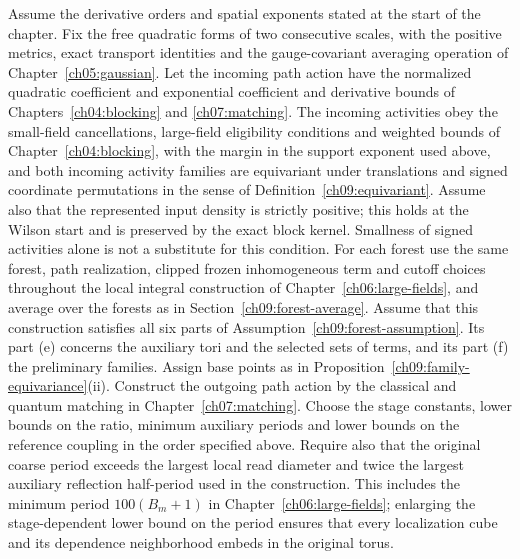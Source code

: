 \begin{theorem}
\label{ch09:step-theorem}
Assume the derivative orders and spatial exponents stated at
the start of the chapter. Fix the free quadratic forms of two consecutive scales, with the
positive metrics, exact transport identities and the gauge-covariant averaging operation
of Chapter~\ref{ch05:gaussian}. Let the incoming path action have the
normalized quadratic coefficient and exponential coefficient and
derivative bounds of Chapters~\ref{ch04:blocking} and
\ref{ch07:matching}. The incoming activities obey the small-field
cancellations, large-field eligibility conditions and weighted bounds of
Chapter~\ref{ch04:blocking}, with the margin in the support exponent used above, and both incoming activity families are equivariant under translations and signed coordinate permutations in the sense of Definition~\ref{ch09:equivariant}.
Assume also that the represented input density is strictly positive;
this holds at the Wilson start and is preserved by the exact block
kernel. Smallness of signed activities alone is not a substitute
for this condition.
For each forest use the same forest, path realization, clipped frozen inhomogeneous term and
cutoff choices throughout the local integral construction of
Chapter~\ref{ch06:large-fields}, and average over the forests as in Section~\ref{ch09:forest-average}. Assume that this construction satisfies all six parts of Assumption~\ref{ch09:forest-assumption}. Its part (e) concerns the auxiliary tori and the selected sets of terms, and its part (f) the preliminary families. Assign base points as in Proposition~\ref{ch09:family-equivariance}(ii). Construct the outgoing path action by the
classical and quantum matching in Chapter~\ref{ch07:matching}.
Choose the stage constants, lower bounds on the ratio, minimum
auxiliary periods and lower bounds on the reference coupling in the order
specified above.
Require also that the original coarse period exceeds the largest
local read diameter and twice the largest auxiliary reflection
half-period used in the construction. This includes the minimum
period $100(B_m+1)$ in Chapter~\ref{ch06:large-fields}; enlarging
the stage-dependent lower bound on the period ensures that every localization
cube and its dependence neighborhood embeds in the original torus.


\end{theorem}
